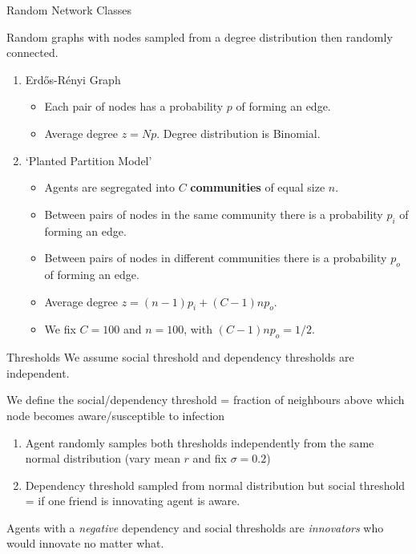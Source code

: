 \documentclass[10pt, xcolor=dvipsnames]{beamer}
\begin{document}
\begin{frame}{Random Network Classes}

Random graphs with nodes sampled from a degree distribution then randomly connected.
\begin{enumerate}
\pause \item Erdős-Rényi Graph \cite{erdos_random_1959} \cite{newman_random_2001}
\begin{itemize}
\item Each pair of nodes has a probability $p$ of forming an edge.
\pause \item Average degree $z = Np$. Degree distribution is Binomial.
\end{itemize}
\pause \item `Planted Partition Model'\cite{karrer_stochastic_2011}
\begin{itemize}
\item Agents are segregated into $C$ \textbf{communities} of equal size $n$.
\pause \item Between pairs of nodes in the same community there is a probability $p_i$ of forming an edge.
\pause \item Between pairs of nodes in different communities there is a probability $p_o$ of forming an edge.
\pause \item Average degree $z = (n-1)p_i + (C-1)np_o$.
\pause \item We fix $C=100$ and $n=100$, with $(C-1)np_o = 1/2$.
\end{itemize}
\end{enumerate}
\end{frame}


\begin{frame}{Thresholds}
We assume social threshold and dependency thresholds are independent. \cite{lee_threshold_2014}

\pause We define the social/dependency threshold  = fraction of neighbours above which node becomes aware/susceptible to infection

\begin{enumerate}
\pause \item Agent randomly samples both thresholds independently from the same normal distribution (vary mean $r$ and fix $\sigma = 0.2$) \cite{gleeson_seed_2007}
\pause \item Dependency threshold sampled from normal distribution but social threshold = if one friend is innovating agent is aware.
\end{enumerate}

Agents with a \emph{negative} dependency and social thresholds are \emph{innovators} who would innovate no matter what.

\end{frame}
\end{document}

